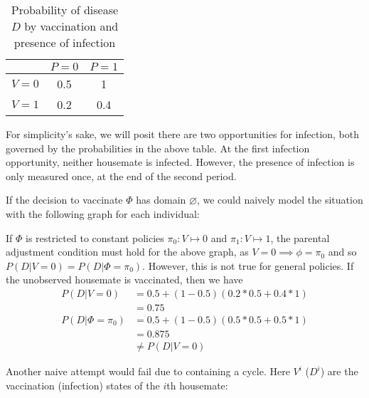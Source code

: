 \begin{table}[]
    \centering
    \begin{tabular}{c|c|c}
        & $P=0$ & $P=1$ \\
         \hline
        $V=0$ & 0.5 & 1 \\
        $V=1$ & 0.2 & 0.4
    \end{tabular}
    \caption{Probability of disease $D$ by vaccination and presence of infection}
    \label{tab:vaccination_interaction}
\end{table}

For simplicity's sake, we will posit there are two opportunities for infection, both governed by the probabilities in the above table. At the first infection opportunity, neither housemate is infected. However, the presence of infection is only measured once, at the end of the second period.

If the decision to vaccinate $\Phi$ has domain $\varnothing$, we could naively model the situation with the following graph for each individual:

\begin{center}
\end{center}

If $\Phi$ is restricted to constant policies $\pi_0:V\mapsto 0$ and $\pi_1:V\mapsto 1$, the parental adjustment condition must hold for the above graph, as $V=0\implies \phi=\pi_0$ and so $P(D|V=0)=P(D|\Phi=\pi_0)$. However, this is not true for general policies. If the unobserved housemate is vaccinated, then we have
\begin{align}
    P(D|V=0) &= 0.5 + (1-0.5)(0.2*0.5+0.4*1) \\
             &= 0.75 \\
    P(D|\Phi=\pi_0) &= 0.5 + (1-0.5)(0.5*0.5 + 0.5*1) \\
            &= 0.875 \\
            &\neq P(D|V=0)
\end{align}

Another naive attempt would fail due to containing a cycle. Here $V^i$ ($D^i$) are the vaccination (infection) states of the $i$th housemate:

